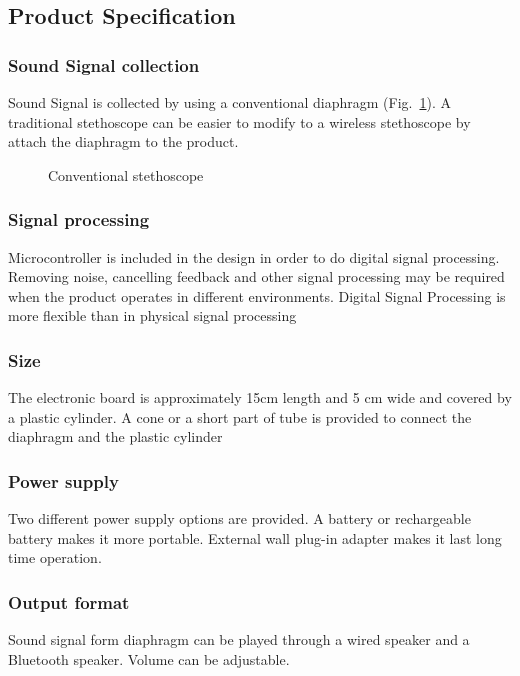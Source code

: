 \subsection{Product Specification}
\subsubsection{Sound Signal collection}
Sound Signal is collected by using a conventional diaphragm (Fig.~\ref{fig:conventional_stethoscope}). A traditional stethoscope can be easier to modify to a wireless stethoscope by attach the diaphragm to the product.
\begin{figure}[!htbp]
	\centering
	\caption{Conventional stethoscope}
	\label{fig:conventional_stethoscope}
\end{figure}

\subsubsection{Signal processing}
Microcontroller is included in the design in order to do digital signal processing. Removing noise, cancelling feedback and other signal processing may be required when the product operates in different environments. Digital Signal Processing is more flexible than in physical signal processing

\subsubsection{Size}
The electronic board is approximately 15cm length and 5 cm wide and covered by a plastic cylinder. A cone or a short part of tube is provided to connect the diaphragm and the plastic cylinder 
 
\subsubsection{Power supply}
Two different power supply options are provided.
A battery or rechargeable battery makes it more portable.
External wall plug-in adapter makes it last long time operation.

\subsubsection{Output format}
Sound signal form diaphragm can be played through a wired speaker and a Bluetooth speaker.
Volume can be adjustable.

